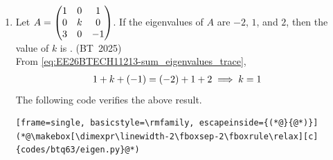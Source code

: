 \begin{enumerate}[label=\thesubsection.\arabic*, ref=\thesubsection.\theenumi,itemsep=0pt]
%
which can be expressed as
difference equation 
\begin{align}
a_n  - \frac{1}{2} a_{n-1}  = \frac{1}{2} u\sbrak{n-1}
\end{align}
%
From \eqref{eq:EE26BTECH11213-z_shift_property} and 
	\eqref{eq:EE26BTECH11213-z_shift_property},
\begin{align}
A\brak{z} - \frac{1}{2} z^{-1} A\brak{z} &= \frac{\frac{1}{2} z^{-1}}{1 - z^{-1}}
\\
\implies A\brak{z} = \frac{\frac{1}{2} z^{-1}}{\brak{1 - z^{-1}}\brak{1 - \frac{1}{2} z^{-1}}}, \quad \abs{z} > 1
\\
 & = \frac{1}{1 - z^{-1}} - \frac{1}{1 - \frac{1}{2} z^{-1}}
\end{align}
%
From \eqref{eq:EE26BTECH11213-z_step_transform} and \eqref{eq:EE26BTECH11213-z_inv_exponential},
\begin{align}
a_n = \sbrak{1 - \brak{\frac{1}{2}}^n} u\sbrak{n} = 1 - 2^{-n}, \quad n \ge 0
\end{align}
Applying the stopping threshold condition $\abs{1 - a_n} < \frac{1}{2^{10}}$,
\begin{align}
\abs{1 - \brak{1 - 2^{-n}}} &< \frac{1}{2^{10}} \\
\implies
2^{-n} &< 2^{-10} \\
\text{or, }n > 10.
\end{align}
%
Since $n$ must be an integer, the minimal integer satisfying the strict inequality is
\begin{align}
n = 11
\end{align}
%
The following code verifies the result.
%
\begin{lstlisting}[frame=single, basicstyle=\rmfamily, escapeinside={(*@}{@*)}]
(*@\makebox[\dimexpr\linewidth-2\fboxsep-2\fboxrule\relax][c]{codes/btq59/ztransform.c}@*)
\end{lstlisting}
%
\item Let $A = \begin{pmatrix}1 & 0 & 1 \\ 0 & k & 0 \\ 3 & 0 & -1\end{pmatrix}$. If the eigenvalues of $A$ are $-2$, $1$, and $2$, then the value of $k$ is \underline{\hspace{2cm}}.
\hfill (BT~2025)
\\
%
\solution
From \eqref{eq:EE26BTECH11213-sum_eigenvalues_trace}, 
\begin{align}
	1 + k + \left(-1\right) &=\left(-2\right) + 1 + 2 
\implies k =  1
\end{align}
The following code verifies the above result.
%
\begin{lstlisting}[frame=single, basicstyle=\rmfamily, escapeinside={(*@}{@*)}]
(*@\makebox[\dimexpr\linewidth-2\fboxsep-2\fboxrule\relax][c]{codes/btq63/eigen.py}@*)
\end{lstlisting}

\end{enumerate}
